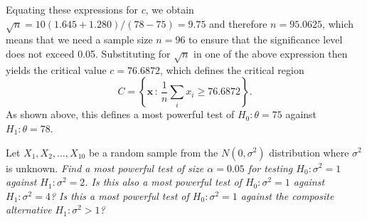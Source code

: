 \begin{exercise}
\begin{questions}
\begin{answer}
Equating these expressions for $c$, we obtain $\sqrt{n} = 10(1.645+1.280)/(78-75) = 9.75$ and therefore $n=95.0625$, which means that we need a sample size $n=96$ to ensure that the significance level does not exceed 0.05. Substituting for $\sqrt{n}$ in one of the above expression then yields the critical value $c = 76.6872$, which defines the critical region 
\[
\displaystyle C=\left\{\mathbf{x}\,:\,\frac{1}{n}\sum_i x_i\geq 76.6872\right\}.
\]
As shown above, this defines a most powerful test of $H_0:\theta=75$ against $H_1:\theta=78$.
\een
\end{answer}

\question  %
Let $X_1,X_2,\ldots,X_{10}$ be a random sample from the $N(0,\sigma^2)$ distribution where $\sigma^2$ is unknown. 
\ben
\it Find a most powerful test of size $\alpha=0.05$ for testing $H_0:\sigma^2=1$ against $H_1:\sigma^2=2$. 
\it Is this also a most powerful test of $H_0:\sigma^2=1$ against $H_1:\sigma^2=4$?
\it Is this a most powerful test of $H_0:\sigma^2=1$ against the composite alternative $H_1:\sigma^2>1$?
\een


\end{questions}
\end{exercise}

